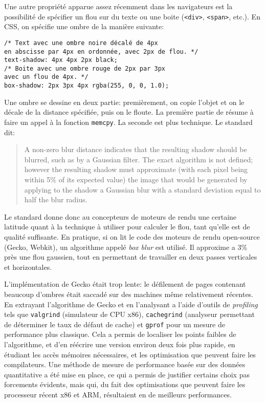 \documentclass[a4paper,10pt]{article}
\newcommand{\cc}[1]{\texttt{#1}}
\begin{document}
\begin{multicols}{2}
  Une autre propriété apparue assez récemment dans les navigateurs est la
  possibilité de spécifier un flou sur du texte ou une boite (\cc{<div>},
  \cc{<span>}, etc.). En CSS, on spécifie une ombre de la manière suivante:

    \noindent
  {\footnotesize
  \cc{/* Text avec une ombre noire décalé de 4px\\
    en abscisse par 4px en ordonnée, avec 2px de flou. */\\
    text-shadow: 4px 4px 2px black;\\
    /* Boite avec une ombre rouge de 2px par 3px\\
    avec un flou de 4px. */\\
    box-shadow: 2px 3px 4px rgba(255, 0, 0, 1.0);
  }}

  Une ombre se dessine en deux partie: premièrement, on copie l'objet et on le
  décale de la distance spécifiée, puis on le floute. La première partie de
  résume à faire un appel à la fonction \cc{memcpy}. La seconde est plus
  technique. Le standard dit:

  \begin{quote}
    A non-zero blur distance indicates that the resulting shadow should be
    blurred, such as by a Gaussian filter. The exact algorithm is not defined;
    however the resulting shadow must approximate (with each pixel being within
    5\% of its expected value) the image that would be generated by applying to
    the shadow a Gaussian blur with a standard deviation equal to half the blur
    radius.
  \end{quote}

  Le standard donne donc au concepteurs de moteurs de rendu une certaine
  latitude quant à la technique à utiliser pour calculer le flou, tant qu'elle
  est de qualité suffisante. En pratique, si on lit le code des moteurs de rendu
  open-source (Gecko, Webkit), un algorithme appelé \emph{box blur} est utilisé.
  Il approxime a 3\% près une flou gaussien, tout en permettant de travailler en
  deux passes verticales et horizontales.

  L'implémentation de Gecko était trop lente: le défilement de pages
  contenant beaucoup d'ombres était saccadé sur des machines même relativement
  récentes. En extrayant l'algorithme de Gecko et en l'analysant a l'aide
  d'outils de \emph{profiling} tels que \cc{valgrind} (simulateur de CPU x86),
  \cc{cachegrind} (analyseur permettant de déterminer le taux de défaut de
  cache) et \cc{gprof} pour un mesure de performance plus classique. Cela a
  permis de localiser les points faibles de l'algorithme, et d'en réécrire une
  version environ deux fois plus rapide, en étudiant les accès mémoires
  nécessaires, et les optimisation que peuvent faire les compilateurs. Une
  méthode de mesure de performance basée sur des données quantitative a été mise
  en place, ce qui a permis de justifier certains choix pas forcements évidents,
  mais qui, du fait des optimisations que peuvent faire les processeur récent
  x86 et ARM, résultaient en de meilleurs performances.


\end{multicols}
\end{document}
